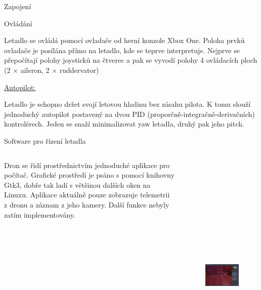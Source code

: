 \documentclass[final]{beamer}
\newlength{\colwidth}
\begin{document}
\begin{frame}[t]
\begin{columns}[t]
\begin{column}{\colwidth}
\begin{block}{Zapojení}
			\end{block}



			\begin{block}{Ovládání}

				Letadlo se ovládá pomocí ovladače od herní konzole Xbox One.
				Poloha prvků ovladače je posílána přímo na letadlo, kde se teprve interpretuje.
				Nejprve se přepočítají polohy joysticků na čtverec a pak se vyvodí polohy 4 ovládacích ploch (2 $\times$ aileron, 2 $\times$ ruddervator)

				\underline{Autopilot:}

				Letadlo je schopno držet svojí letovou hladinu bez zásahu pilota.
				K tomu slouží jednoduchý autopilot postavený na dvou PID (proporčně-integračně-derivačních) kontrolérech.
				Jeden se snaží minimalizovat yaw letadla, druhý pak jeho pitch.

			\end{block}

      \begin{block}{Software pro řízení letadla}

			\begin{columns}[T]
				\begin{column}{.4\textwidth}
					Dron se řídí prostřednictvím jednoduché aplikace pro počítač.
					Grafické prostředí je psáno s pomocí knihovny Gtk3, dobře tak ladí s většinou dalších oken na Linuxu.
					Aplikace aktuálně pouze zobrazuje telemetrii z dronu a záznam z jeho kamery.
					Další funkce nebyly zatím implementovány.

				\end{column}
				\begin{column}{.6\textwidth}
			\begin{figure}[h]
				\centering
				\includegraphics[height=12cm]{../img/interface.png}
			\end{figure}


\end{column}
\end{columns}
\end{block}
\end{column}
\end{columns}
\end{frame}
\end{document}
